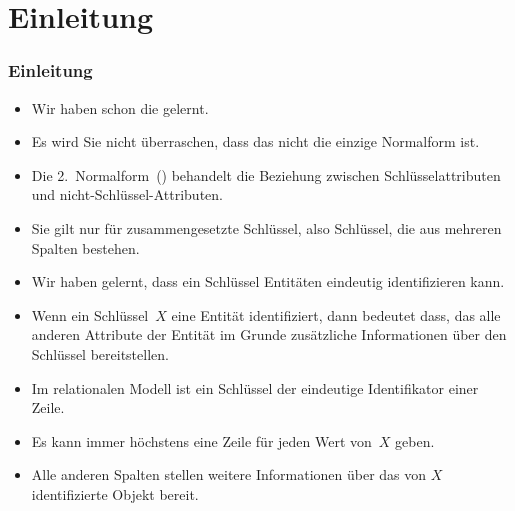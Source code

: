\documentclass[aspectratio=169,mathserif,notheorems]{beamer}%
\subtitle{42.~Logisches Schema:~2.~Normalform}%
\begin{document}
%
%
\startPresentation%
%
\section{Einleitung}%
%
\begin{frame}%
\frametitle{Einleitung}%
\begin{itemize}%
%
\item Wir haben schon die  gelernt.%
%
\item<2-> Es wird Sie nicht überraschen, dass das nicht die einzige Normalform ist.%
%
\item<3-> Die 2.~Normalform~() behandelt die Beziehung zwischen Schlüsselattributen und nicht-Schlüssel-Attributen\cite{C1971FNOTDBRM,C1971NDBSABT,K1983ASGTFNFIRDT,D2003AITDS,EN2015FODS}.%
%
\item<4-> Sie gilt nur für zusammengesetzte Schlüssel, also Schlüssel, die aus mehreren Spalten bestehen.%
%
\item<5-> Wir haben gelernt, dass ein Schlüssel Entitäten eindeutig identifizieren kann.%
%
\item<6-> Wenn ein Schlüssel~$X$ eine Entität identifiziert, dann bedeutet dass, das alle anderen Attribute der Entität im Grunde zusätzliche Informationen über den Schlüssel bereitstellen.%
%
\item<7-> Im relationalen Modell ist ein Schlüssel der eindeutige Identifikator einer Zeile.%
%
\item<8-> Es kann immer höchstens eine Zeile für jeden Wert von~$X$ geben.%
%
\item<9-> Alle anderen Spalten stellen weitere Informationen über das von $X$ identifizierte Objekt bereit.%
%
\end{itemize}%
\end{frame}%
%
\end{document}
